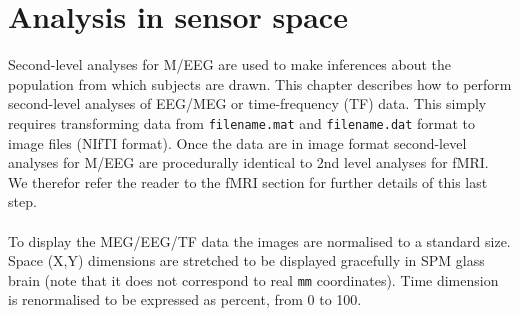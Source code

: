 \chapter{Analysis in sensor space \label{Chap:eeg:sensoranalysis}}

Second-level analyses for M/EEG are used to make inferences about the population from which subjects are drawn. This chapter describes how to perform second-level analyses of EEG/MEG or time-frequency (TF) data. This simply requires transforming data from \texttt{filename.mat} and \texttt{filename.dat}
format to image files (NIfTI format). Once the data are in image format second-level analyses for M/EEG are procedurally identical to 2nd level analyses for fMRI.
We therefor refer the reader to the fMRI section for further details of this last step.
\\
\\
To display the MEG/EEG/TF data the images are normalised to a standard size. Space (X,Y) dimensions are stretched to be displayed gracefully in SPM glass brain (note that it does not correspond to real \texttt{mm} coordinates). Time dimension is renormalised to be expressed as percent, from 0 to 100.

